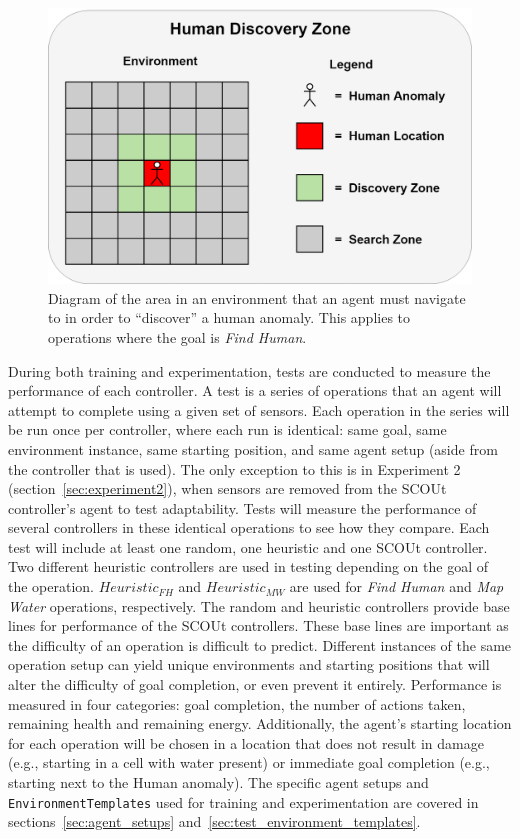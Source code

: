 \begin{figure}[H]
  \includegraphics[width=0.8\columnwidth]{Figures/human_discovery_zone.png}
  \caption{Diagram of the area in an environment that an agent must navigate to in order to ``discover'' a human anomaly. This applies to operations where the goal is \textit{Find Human}.}
  \label{fig:human_discovery_zone}
\end{figure}


During both training and experimentation, tests are conducted to measure the performance of each controller.
A test is a series of operations that an agent will attempt to complete using a given set of sensors.
Each operation in the series will be run once per controller, where each run is identical: same goal, same environment instance, same starting position, and same agent setup (aside from the controller that is used).
The only exception to this is in Experiment 2 (section~\ref{sec:experiment2}), when sensors are removed from the SCOUt controller's agent to test adaptability.
Tests will measure the performance of several controllers in these identical operations to see how they compare.
Each test will include at least one random, one heuristic and one SCOUt controller.
Two different heuristic controllers are used in testing depending on the goal of the operation.
$Heuristic_{FH}$ and $Heuristic_{MW}$ are used for \textit{Find Human} and \textit{Map Water} operations, respectively.
The random and heuristic controllers provide base lines for performance of the SCOUt controllers.
These base lines are important as the difficulty of an operation is difficult to predict.
Different instances of the same operation setup can yield unique environments and starting positions that will alter the difficulty of goal completion, or even prevent it entirely.
Performance is measured in four categories: goal completion, the number of actions taken, remaining health and remaining energy.
Additionally, the agent's starting location for each operation will be chosen in a location that does not result in damage (e.g., starting in a cell with water present) or immediate goal completion (e.g., starting next to the Human anomaly).
The specific agent setups and \texttt{EnvironmentTemplates} used for training and experimentation are covered in sections~\ref{sec:agent_setups} and~\ref{sec:test_environment_templates}.


